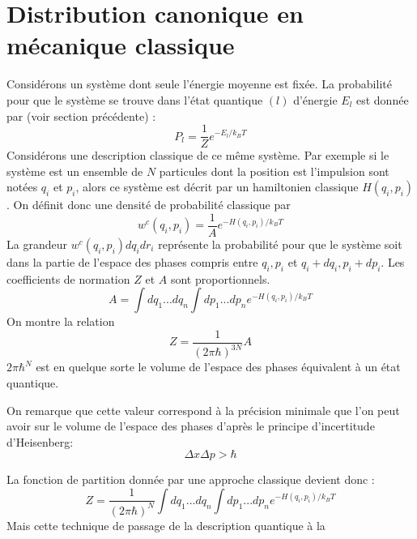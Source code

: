 \documentclass[12pt]{book}
\begin{document}
\section{Distribution canonique en m\'ecanique
classique}\label{secdistclassi} 
Consid\'erons un syst\`eme dont seule l'\'energie moyenne est fix\'ee.
La probabilit\'e pour que le syst\`eme se trouve dans l'\'etat
quantique $(l)$ d'\'energie $E_l$ est donn\'ee par (voir section
pr\'ec\'edente) :
\begin{equation}
P_l=\frac{1}{Z}e^{-E_l/k_BT}
\end{equation}
Consid\'erons une description classique de ce m\^eme syst\`eme. Par
exemple si le syst\`eme est un ensemble de $N$ particules dont la
position 
est l'impulsion sont not\'ees $q_i$ et $p_i$, alors ce syst\`eme est
d\'ecrit par un hamiltonien classique $H(q_i,p_i)$.
On d\'efinit donc une densit\'e de probabilit\'e classique par
\begin{equation}\label{eqdensiprobaclas}
w^c(q_i,p_i)=\frac{1}{A}e^{-H(q_i,p_i)/k_BT}
\end{equation}
La grandeur $w^c(q_i,p_i)dq_idr_i$ repr\'esente la probabilit\'e pour
que le syst\`eme soit dans la partie de l'espace des phases compris
entre $q_i,p_i$ et $q_i+dq_i, p_i+dp_i$.
Les coefficients de normation $Z$ et $A$ sont proportionnels.
\begin{equation}
A=\int dq_1...dq_n\int dp_1...dp_n e^{-H(q_i,p_i)/k_BT}
\end{equation}
On montre \cite{ph:physt:Diu89} la relation
\begin{equation}
Z=\frac{1}{(2\pi\hbar)^{3N}}A
\end{equation}
$2\pi\hbar^N$ est en quelque sorte le volume de l'espace des phases
\'equivalent \`a un \'etat quantique.
\begin{rem}
On remarque que cette
valeur correspond \`a la pr\'ecision minimale que l'on peut avoir sur
le volume de l'espace des phases d'apr\`es le principe d'incertitude
d'Heisenberg:
\begin{equation}
\Delta x \Delta p > \hbar
\end{equation}
\end{rem}
La fonction de partition donn\'ee par une approche classique devient
donc :
\begin{equation}
Z=\frac{1}{(2\pi\hbar)^N}\int dq_1...dq_n\int dp_1...dp_n e^{-H(q_i,p_i)/k_BT}
\end{equation}
Mais cette technique de passage de la description quantique \`a la
\end{document}
